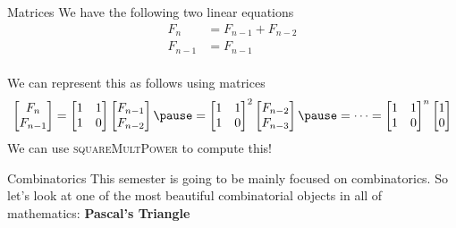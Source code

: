 \documentclass[aspectratio=169]{beamer}
\begin{document}
\begin{frame}{Matrices}
    We have the following two linear equations
    \begin{align*}
        F_n &= F_{n - 1} + F_{n - 2} \\
        F_{n - 1} &= F_{n - 1} \\
    \end{align*}
    
    \pause
    
    We can represent this as follows using matrices
    \[
    \begin{bmatrix} F_{n} \\ F_{n - 1} \\ \end{bmatrix} = \begin{bmatrix} 1 & 1 \\ 1 & 0 \\ \end{bmatrix} \begin{bmatrix} F_{n - 1} \\ F_{n - 2} \\ \end{bmatrix} \pause = \begin{bmatrix} 1 & 1 \\ 1 & 0 \\ \end{bmatrix}^2 \begin{bmatrix} F_{n - 2} \\ F_{n - 3} \\ \end{bmatrix} \pause = \cdots = \begin{bmatrix} 1 & 1 \\ 1 & 0 \\ \end{bmatrix}^n \begin{bmatrix} 1 \\ 0 \\ \end{bmatrix}
    \]
    We can use \textsc{squareMultPower} to compute this!
\end{frame}

\begin{frame}{Combinatorics}
    This semester is going to be mainly focused on combinatorics. So let's look at one of the most beautiful combinatorial objects in all of mathematics: \textbf{Pascal's Triangle}
\end{frame}
\end{document}

